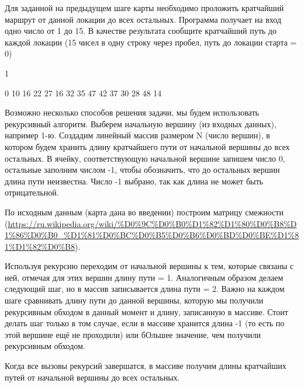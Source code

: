 
Для заданной на предыдущем шаге карты необходимо проложить кратчайший маршрут от данной 
локации до всех остальных. Программа получает на вход одно число от 1 до 15. 
В качестве результата сообщите кратчайший путь до каждой локации 
(15 чисел в одну строку через пробел, путь до локации старта = 0)

\begin{myverbbox}[\small]{\vinput}
    1
\end{myverbbox}
\begin{myverbbox}[\small]{\voutput}
    0 10 16 22 27 16 32 35 47 42 37 30 28 48 14
\end{myverbbox}

\explanationSection

Возможно несколько способов решения задачи, мы будем использовать рекурсивный алгоритм. Выберем начальную вершину (из входных данных), например 1-ю. Создадим линейный массив размером N (число вершин), в котором будем хранить длину кратчайшего пути от начальной вершины до всех остальных. В ячейку, соответствующую начальной вершине запишем число 0, остальные заполним числом -1, чтобы обозначить, что до остальных вершин длина пути неизвестна. Число -1 выбрано, так как длина не может быть отрицательной. 

По исходным данным (карта дана во введении) построим матрицу смежности (\url{https://ru.wikipedia.org/wiki/%D0%9C%D0%B0%D1%82%D1%80%D0%B8%D1%86%D0%B0_%D1%81%D0%BC%D0%B5%D0%B6%D0%BD%D0%BE%D1%81%D1%82%D0%B8}).

Используя рекурсию переходим от начальной вершины к тем, которые связаны с ней, отмечая для этих вершин длину пути = 1. Аналогичным образом делаем следующий шаг, но в массив записывается длина пути = 2. Важно на каждом шаге сравнивать длину пути до данной вершины, которую мы получили рекурсивным обходом в данный момент и длину, записанную в массиве. Стоит делать шаг только в том случае, если в массиве хранится длина -1 (то есть по этой вершине ещё не проходили) или бОльшее значение, чем получили рекурсивным обходом.

Когда все вызовы рекурсий завершатся, в массиве получим длины кратчайших путей от начальной вершины до всех остальных.